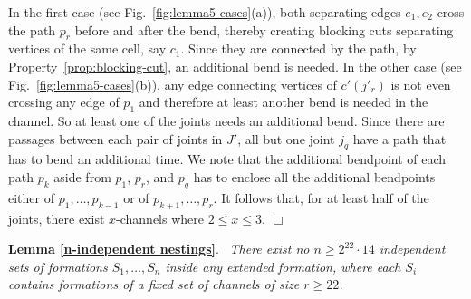 \documentclass[a4paper,10pt]{llncs}
\newcounter{prop}
\renewenvironment{proof}
{{\bf Proof:}}{\hspace*{\fill}$\Box$\par\vspace{2mm}}
\newcommand{\rephrase}[3]{\noindent\textbf{#1 #2}.~\emph{#3}}
\begin{document}
\begin{proof}
In the first case (see Fig.~\ref{fig:lemma5-cases}(a)), both separating edges $e_1,e_2$ cross the path $p_r$ before and after the bend, thereby creating blocking cuts separating vertices of the same cell, say $c_1$. Since they are connected by the path, by Property~\ref{prop:blocking-cut}, an additional bend is needed.
In the other case (see Fig.~\ref{fig:lemma5-cases}(b)), any edge connecting vertices of $c'(j'_r)$ is not even crossing any edge of $p_1$ and therefore at least another bend is needed in the channel.
So at least one of the joints needs an additional bend. Since there are passages between each pair of joints in $J'$, all but one joint $j_q$ have a path that has to bend an additional time. We note that the additional bendpoint of each path $p_k$ aside from $p_1$, $p_r$, and $p_q$ has to enclose all the additional bendpoints either of $p_1, \ldots , p_{k-1}$ or of $p_{k+1}, \ldots , p_r$. It follows that, for at least half of the joints, there exist $x$-channels where $2\leq x \leq 3$.
\end{proof}

\rephrase{Lemma}{\ref{n-independent nestings}}{
There exist no $n\geq 2^{22}\cdot 14$ independent sets of formations $S_1,\ldots ,S_n$ inside any extended formation,
where each $S_i$ contains formations of a fixed set of channels of size $r\geq 22$.
}
\end{document}
